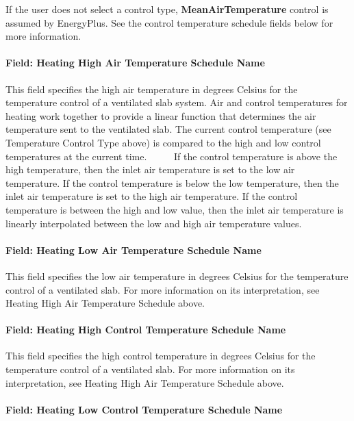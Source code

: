 If the user does not select a control type, \textbf{MeanAirTemperature} control is assumed by EnergyPlus. See the control temperature schedule fields below for more information.

\paragraph{Field: Heating High Air Temperature Schedule Name}\label{field-heating-high-air-temperature-schedule-name}

This field specifies the high air temperature in degrees Celsius for the temperature control of a ventilated slab system. Air and control temperatures for heating work together to provide a linear function that determines the air temperature sent to the ventilated slab. The current control temperature (see Temperature Control Type above) is compared to the high and low control temperatures at the current time.~~~~~ If the control temperature is above the high temperature, then the inlet air temperature is set to the low air temperature. If the control temperature is below the low temperature, then the inlet air temperature is set to the high air temperature. If the control temperature is between the high and low value, then the inlet air temperature is linearly interpolated between the low and high air temperature values.

\paragraph{Field: Heating Low Air Temperature Schedule Name}\label{field-heating-low-air-temperature-schedule-name}

This field specifies the low air temperature in degrees Celsius for the temperature control of a ventilated slab. For more information on its interpretation, see Heating High Air Temperature Schedule above.

\paragraph{Field: Heating High Control Temperature Schedule Name}\label{field-heating-high-control-temperature-schedule-name-1}

This field specifies the high control temperature in degrees Celsius for the temperature control of a ventilated slab. For more information on its interpretation, see Heating High Air Temperature Schedule above.

\paragraph{Field: Heating Low Control Temperature Schedule Name}\label{field-heating-low-control-temperature-schedule-name-1}

